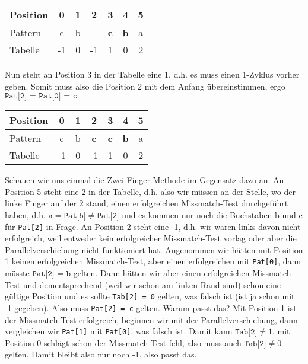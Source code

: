 \documentclass[a4paper, 12pt]{article}
\begin{document}
	\begin{center}
		\begin{tabular}{l|cccccc}
			Position & 0 & 1 & 2 & 3 & 4 & 5 \\  \hline
			Pattern & c & b & & \textbf{c} & \textbf{b} & a \\ \hline
			Tabelle & -1 & 0 & -1 & 1 & 0 & 2
		\end{tabular}
	\end{center}

	Nun steht an Position 3 in der Tabelle eine 1, d.h. es muss einen 1-Zyklus vorher geben. Somit muss also die Position 2 mit dem Anfang übereinstimmen, ergo $\texttt{Pat[2] = Pat[0] = c}$
	
	\begin{center}
		\begin{tabular}{l|cccccc}
			Position & 0 & 1 & 2 & 3 & 4 & 5 \\  \hline
			Pattern & c & b & \textbf{c} & \textbf{c} & \textbf{b} & a \\ \hline
			Tabelle & -1 & 0 & -1 & 1 & 0 & 2
		\end{tabular}
	\end{center}

	\pagebreak
	
	Schauen wir uns einmal die Zwei-Finger-Methode im Gegensatz dazu an.
	An Position 5 steht eine 2 in der Tabelle, d.h. also wir müssen an der Stelle, wo der linke Finger auf der 2 stand, einen erfolgreichen Missmatch-Test durchgeführt haben, d.h. $\texttt{a} = \texttt{Pat[5]} \neq \texttt{Pat[2]}$ und es kommen nur noch die Buchstaben b und c für \texttt{Pat[2]} in Frage. An Position 2 steht eine -1, d.h. wir waren links davon nicht erfolgreich, weil entweder kein erfolgreicher Missmatch-Test vorlag oder aber die Parallelverschiebung nicht funktioniert hat. Angenommen wir hätten mit Position 1 keinen erfolgreichen Missmatch-Test, aber einen erfolgreichen mit \texttt{Pat[0]}, dann müsste $\texttt{Pat[2] = b}$ gelten. Dann hätten wir aber einen erfolgreichen Missmatch-Test und dementsprechend (weil wir schon am linken Rand sind) schon eine gültige Position und es sollte \texttt{Tab[2] = 0} gelten, was falsch ist (ist ja schon mit -1 gegeben). Also muss \texttt{Pat[2] = c} gelten. Warum passt das? Mit Position 1 ist der Missmatch-Test erfolgreich, beginnen wir mit der Parallelverschiebung, dann vergleichen wir \texttt{Pat[1]} mit \texttt{Pat[0]}, was falsch ist. Damit kann $\texttt{Tab[2]} \neq 1$, mit Position 0 schlägt schon der Missmatch-Test fehl, also muss auch $\texttt{Tab[2]} \neq 0$ gelten. Damit bleibt also nur noch -1, also passt das.
	
\end{document}
